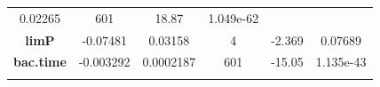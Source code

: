 \documentclass[]{article}
\begin{document}
\begin{longtable}[]{@{}cccccc@{}}
\begin{minipage}[t]{0.14\columnwidth}
0.02265\strut
\end{minipage} & \begin{minipage}[t]{0.06\columnwidth}\centering\strut
601\strut
\end{minipage} & \begin{minipage}[t]{0.12\columnwidth}\centering\strut
18.87\strut
\end{minipage} & \begin{minipage}[t]{0.12\columnwidth}\centering\strut
1.049e-62\strut
\end{minipage}\tabularnewline
\begin{minipage}[t]{0.23\columnwidth}\centering\strut
\textbf{limP}\strut
\end{minipage} & \begin{minipage}[t]{0.12\columnwidth}\centering\strut
-0.07481\strut
\end{minipage} & \begin{minipage}[t]{0.14\columnwidth}\centering\strut
0.03158\strut
\end{minipage} & \begin{minipage}[t]{0.06\columnwidth}\centering\strut
4\strut
\end{minipage} & \begin{minipage}[t]{0.12\columnwidth}\centering\strut
-2.369\strut
\end{minipage} & \begin{minipage}[t]{0.12\columnwidth}\centering\strut
0.07689\strut
\end{minipage}\tabularnewline
\begin{minipage}[t]{0.23\columnwidth}\centering\strut
\textbf{bac.time}\strut
\end{minipage} & \begin{minipage}[t]{0.12\columnwidth}\centering\strut
-0.003292\strut
\end{minipage} & \begin{minipage}[t]{0.14\columnwidth}\centering\strut
0.0002187\strut
\end{minipage} & \begin{minipage}[t]{0.06\columnwidth}\centering\strut
601\strut
\end{minipage} & \begin{minipage}[t]{0.12\columnwidth}\centering\strut
-15.05\strut
\end{minipage} & \begin{minipage}[t]{0.12\columnwidth}\centering\strut
1.135e-43\strut
\end{minipage}\tabularnewline
\begin{minipage}[t]{0.23\columnwidth}\centering\strut

\end{minipage}
\end{longtable}
\end{document}
